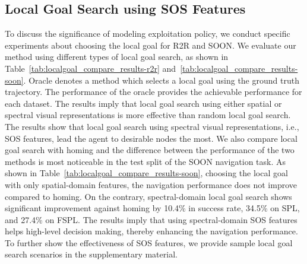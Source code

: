 \documentclass[10pt,twocolumn,letterpaper]{article}
\begin{document}
\subsection{Local Goal Search using SOS Features}
\vspace{-0.15cm}
To discuss the significance of modeling exploitation policy, we conduct specific experiments about choosing the local goal for R2R and SOON. We evaluate our method using different types of local goal search, as shown in Table~\ref{tab:localgoal_compare_results-r2r} and~\ref{tab:localgoal_compare_results-soon}. Oracle denotes a method which selects a local goal using the ground truth trajectory. The performance of the oracle provides the achievable performance for each dataset. The results imply that local goal search using either spatial or spectral visual representations is more effective than random local goal search. The results show that local goal search using spectral visual representations, i.e., SOS features, lead the agent to desirable nodes the most. We also compare local goal search with homing and the difference between the performance of the two methods is most noticeable in the test split of the SOON navigation task. As shown in Table~\ref{tab:localgoal_compare_results-soon}, choosing the local goal with only spatial-domain features, the navigation performance does not improve compared to homing.
On the contrary, spectral-domain local goal search shows significant improvement against homing by 10.4\% in success rate, 34.5\% on SPL, and 27.4\% on FSPL. The results imply that using spectral-domain SOS features helps high-level decision making, thereby enhancing the navigation performance. To further show the effectiveness of SOS features, we provide sample local goal search scenarios in the supplementary material.
\vspace{-0.2cm}
\end{document}
